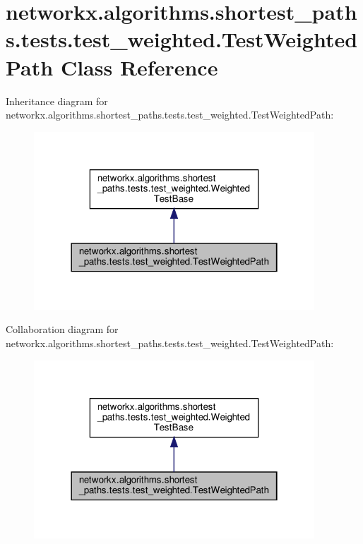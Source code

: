 \hypertarget{classnetworkx_1_1algorithms_1_1shortest__paths_1_1tests_1_1test__weighted_1_1TestWeightedPath}{}\section{networkx.\+algorithms.\+shortest\+\_\+paths.\+tests.\+test\+\_\+weighted.\+Test\+Weighted\+Path Class Reference}
\label{classnetworkx_1_1algorithms_1_1shortest__paths_1_1tests_1_1test__weighted_1_1TestWeightedPath}


Inheritance diagram for networkx.\+algorithms.\+shortest\+\_\+paths.\+tests.\+test\+\_\+weighted.\+Test\+Weighted\+Path\+:
\nopagebreak
\begin{figure}[H]
\begin{center}
\leavevmode
\includegraphics[width=298pt]{classnetworkx_1_1algorithms_1_1shortest__paths_1_1tests_1_1test__weighted_1_1TestWeightedPath__inherit__graph}
\end{center}
\end{figure}


Collaboration diagram for networkx.\+algorithms.\+shortest\+\_\+paths.\+tests.\+test\+\_\+weighted.\+Test\+Weighted\+Path\+:
\nopagebreak
\begin{figure}[H]
\begin{center}
\leavevmode
\includegraphics[width=298pt]{classnetworkx_1_1algorithms_1_1shortest__paths_1_1tests_1_1test__weighted_1_1TestWeightedPath__coll__graph}
\end{center}
\end{figure}
